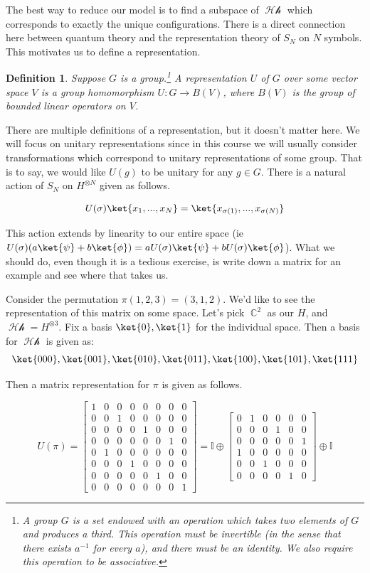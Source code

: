 \documentclass{article}
\DeclareMathOperator{\Hh}{\mathcal{Hh}}
\DeclareMathOperator{\CC}{\mathbb{C}}
\newtheorem{defn}{Definition}
\begin{document}
The best way to reduce our model is to find a subspace of $\Hh$ which corresponds to exactly the unique configurations. There is a direct connection here between quantum theory and the representation theory of $S_N$ on $N$ symbols. This motivates us to define a representation.

\begin{defn}
Suppose $G$ is a group.\footnote{A group $G$ is a set endowed with an operation which takes two elements of $G$ and produces a third. This operation must be invertible (in the sense that there exists $a^{-1}$ for every $a$), and there must be an identity. We also require this operation to be associative.} A representation $U$ of $G$ over some vector space $V$ is a group homomorphism $U:G \to B(V)$, where $B(V)$ is the group of bounded linear operators on $V$.
\end{defn}

There are multiple definitions of a representation, but it doesn't matter here. We will focus on unitary representations since in this course we will usually consider transformations which correspond to unitary representations of some group. That is to say, we would like $U(g)$ to be unitary for any $g \in G$. There is a natural action of $S_N$ on $H^{\otimes N}$ given as follows.

\begin{equation}
U(\sigma)\ket{x_1,...,x_N} = \ket{x_{\sigma(1)},...,x_{\sigma(N)}}
\end{equation}

This action extends by linearity to our entire space (ie $U(\sigma)(a\ket{\psi}+b\ket{\phi}) = aU(\sigma)\ket{\psi}+bU(\sigma)\ket{\phi}$). What we should do, even though it is a tedious exercise, is write down a matrix for an example and see where that takes us.

Consider the permutation $\pi(1,2,3)=(3,1,2)$. We'd like to see the representation of this matrix on some space. Let's pick $\CC^2$ as our $H$, and $\Hh=H^{\otimes 3}$. Fix a basis $\ket{0},\ket{1}$ for the individual space. Then a basis for $\Hh$ is given as:
\[\ket{000},\ket{001},\ket{010},\ket{011},\ket{100},\ket{101},\ket{111}\]

Then a matrix representation for $\pi$ is given as follows.

\[U(\pi) =  \begin{bmatrix}
1&0&0&0&0&0&0&0\\
0&0&1&0&0&0&0&0\\
0&0&0&0&1&0&0&0\\
0&0&0&0&0&0&1&0\\
0&1&0&0&0&0&0&0\\
0&0&0&1&0&0&0&0\\
0&0&0&0&0&1&0&0\\
0&0&0&0&0&0&0&1
		\end{bmatrix}= \mathbb{I}\oplus
\begin{bmatrix}
0&1&0&0&0&0\\
0&0&0&1&0&0\\
0&0&0&0&0&1\\
1&0&0&0&0&0\\
0&0&1&0&0&0\\
0&0&0&0&1&0
\end{bmatrix}\oplus\mathbb{I}\]
\end{document}
